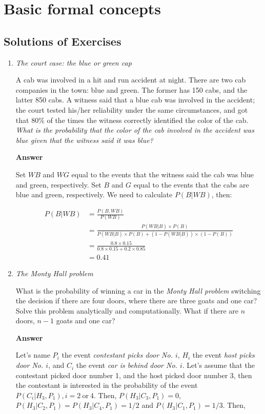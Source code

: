 \chapter{Basic formal concepts}\label{chap1}
\section{Solutions of Exercises}\label{sec11}
\begin{enumerate}[leftmargin=*]
\item \textit{The court case: the blue or green cap}
	
A cab was involved in a hit and run accident at night. There are two cab companies in the town: blue and green. The former has 150 cabs, and the latter 850 cabs. A witness said that a blue cab was involved in the accident; the court tested his/her reliability under the same circumstances, and got that 80\% of the times the witness correctly identified the color of the cab. \textit{What is the probability that the color of the cab involved in the accident was blue given that the witness said it was blue?}
	
\textbf{Answer}
	
Set $WB$ and $WG$ equal to the events that the witness said the cab was blue and green, respectively. Set $B$ and $G$ equal to the events that the cabs are blue and green, respectively. We need to calculate $P(B|WB)$, then:
	
\begin{align}
	P(B|WB)&=\frac{P(B,WB)}{P(WB)}\\
	&=\frac{P(WB|B)\times P(B)}{P(WB|B)\times P(B)+(1-P(WB|B))\times (1-P(B))}\nonumber\\
	&=\frac{0.8\times 0.15}{0.8\times 0.15+0.2\times 0.85}\nonumber\\
	&=0.41\nonumber
\end{align}
	
	
\item \textit{The Monty Hall problem}
	
What is the probability of winning a car in the \textit{Monty Hall problem} switching the decision if there are four doors, where there are three goats and one car? Solve this problem analytically and computationally.  What if there are $n$ doors, $n-1$ goats and one car?
	
\textbf{Answer}
	
Let's name $P_i$ the event \textit{contestant picks door No. $i$}, $H_i$ the event \textit{host picks door No. $i$}, and $C_i$ the event \textit{car is behind door No. $i$}. Let's assume that the contestant picked door number 1, and the host picked door number 3, then the contestant is interested in the probability of the event $P(C_i|H_3,P_1), i = 2 \ \text{or} \ 4$. Then, $P(H_3|C_3,P_1)=0$, $P(H_3|C_2,P_1)=P(H_3|C_4,P_1)=1/2$ and $P(H_3|C_1,P_1)=1/3$. Then,  
	

\end{enumerate}
